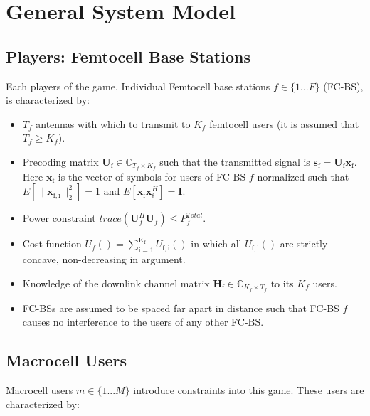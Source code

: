 \documentclass[12pt,a4paper]{report}
\begin{document}
\section{General System Model}\label{genmodel}

\subsection{Players: Femtocell Base Stations}


Each players of the game, Individual Femtocell base stations $f \in \{1 ... F\}$ (FC-BS), is characterized by:
\begin{itemize}
\item 
$T_f$ antennas with which to transmit to $K_f$ femtocell users (it is assumed that $T_f \geq K_f$).
\\
\item 
	Precoding matrix $\mathbf{U}_{\mathrm{f}} \in \mathbb{C}_{T_f \times K_f}$ such that the transmitted 		
	signal is $\mathbf{s}_{\mathrm{f}
	}= \mathbf{U_{\mathrm{f}}}\mathbf{x_{\mathrm{f}}}$. Here $\mathbf{x_{\mathrm{f}}}$ is the 		
	vector of symbols for users of FC-BS $f$ normalized such that $E[\|\mathbf{x}_{\mathrm{f,i}}
	\|_2^2]=1$ and $E[\mathbf{x}_{\mathrm{f}}\mathbf{x}_{\mathrm{f}}^H]=\mathbf{I}$.
\\
\item 
	Power constraint $trace(\mathbf{U}_f^H\mathbf{U}_f) \leq P^{Total}_{f} $.

\item 
	Cost function $U_f() =
	\sum_{\mathrm{i=1}}^{\mathrm{K_f}}
    	U_{\mathrm{f,i}}() $
    	in which all $U_{\mathrm{f,i}}()$ are strictly concave, non-decreasing in argument.

\item 
	Knowledge of the downlink channel matrix $\mathbf{H_\mathrm{f}} \in \mathbb{C}_{K_f \times T_f} $ to its $K_f$ users.
\\
\item
	 FC-BSs are assumed to be spaced far apart in distance such that FC-BS $f$ 
	 causes no interference to the users of any other FC-BS.
\end{itemize}

\subsection{Macrocell Users}
Macrocell users $m \in \{1 ... M\}$ introduce constraints into this game. These users are characterized by:
\end{document}
